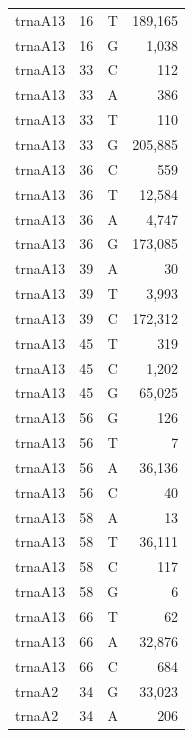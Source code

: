 \documentclass[12pt]{rockefeller}
\begin{document}
{\begin{center}
\begin{supertabular}{|l|r|c|r|}
 trnaA13 &        16 &          T &    189,165 \\
 trnaA13 &        16 &          G &      1,038 \\
 trnaA13 &        33 &          C &        112 \\
 trnaA13 &        33 &          A &        386 \\
 trnaA13 &        33 &          T &        110 \\
 trnaA13 &        33 &          G &    205,885 \\
 trnaA13 &        36 &          C &        559 \\
 trnaA13 &        36 &          T &     12,584 \\
 trnaA13 &        36 &          A &      4,747 \\
 trnaA13 &        36 &          G &    173,085 \\
 trnaA13 &        39 &          A &         30 \\
 trnaA13 &        39 &          T &      3,993 \\
 trnaA13 &        39 &          C &    172,312 \\
 trnaA13 &        45 &          T &        319 \\
 trnaA13 &        45 &          C &      1,202 \\
 trnaA13 &        45 &          G &     65,025 \\
 trnaA13 &        56 &          G &        126 \\
 trnaA13 &        56 &          T &          7 \\
 trnaA13 &        56 &          A &     36,136 \\
 trnaA13 &        56 &          C &         40 \\
 trnaA13 &        58 &          A &         13 \\
 trnaA13 &        58 &          T &     36,111 \\
 trnaA13 &        58 &          C &        117 \\
 trnaA13 &        58 &          G &          6 \\
 trnaA13 &        66 &          T &         62 \\
 trnaA13 &        66 &          A &     32,876 \\
 trnaA13 &        66 &          C &        684 \\
  trnaA2 &        34 &          G &     33,023 \\
  trnaA2 &        34 &          A &        206 \\

\end{supertabular}
\end{center}}
\end{document}
